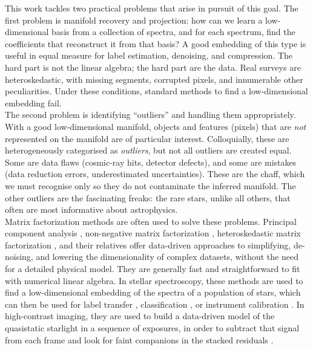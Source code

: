 \documentclass[onecolumn,floatfix]{aastex631}
\begin{document}
This work tackles two practical problems that arise in pursuit of this goal. The first problem is manifold recovery and projection: how can we learn a low-dimensional basis from a collection of spectra, and for each spectrum, find the coefficients that reconstruct it from that basis? A good embedding of this type is useful in equal measure for label estimation, denoising, and compression. The hard part is not the linear algebra; the hard part are the data. Real surveys are heteroskedastic, with missing segments, corrupted pixels, and innumerable other peculiarities. Under these conditions, standard methods to find a low-dimensional embedding fail.\\

The second problem is identifying ``outliers'' and handling them appropriately. With a good low-dimensional manifold, objects and features (pixels) that are \emph{not} represented on the manifold are of particular interest. Colloquially, these are heterogeneously categorised as \emph{outliers}, but not all outliers are created equal. Some are data flaws (cosmic-ray hits, detector defects), and some are mistakes (data reduction errors, underestimated uncertainties). These are the chaff, which we must recognise only so they do not contaminate the inferred manifold. The other outliers are the fascinating freaks: the rare stars, unlike all others, that often are most informative about astrophysics.\\


Matrix factorization methods are often used to solve these problems. Principal component analysis \citep[PCA;][]{pearson1901, hotelling1933}, non-negative matrix factorization \citep{lee1999}, heteroskedastic matrix factorization \citep{tsalmantza2012}, and their relatives offer data-driven approaches to simplifying, de-noising, and lowering the dimensionality of complex datasets, without the need for a detailed physical model.
They are generally fast and straightforward to fit with numerical linear algebra.
In stellar spectroscopy, these methods are used to find a low-dimensional embedding of the spectra of a population of stars, which can then be used for label transfer \citep{ness2015,casey2016}, classification \citep{refiorentin2007}, or instrument calibration \citep{zhao2021,casey2026}.
In high-contrast imaging, they are used to build a data-driven model of the quasistatic starlight in a sequence of exposures, in order to subtract that signal from each frame and look for faint companions in the stacked residuals \citep{soummer2012, amara2012, fergus2014}.\\ %
\end{document}

